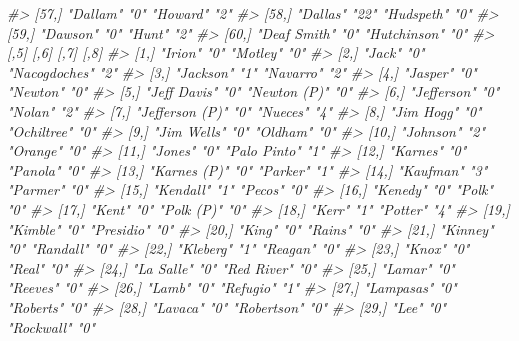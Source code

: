 \documentclass[
]{krantz}
\makeatletter
\newenvironment{Shaded}{\begin{snugshade}}{\end{snugshade}}
\newcommand{\CommentTok}[1]{\textcolor[rgb]{0.37,0.37,0.37}{\textit{#1}}}
\newenvironment{kframe}{%
\medskip{}
\setlength{\fboxsep}{.8em}
 \def\at@end@of@kframe{}%
 \ifinner\ifhmode%
  \def\at@end@of@kframe{\end{minipage}}%
  \begin{minipage}{\columnwidth}%
 \fi\fi%
 \def\FrameCommand##1{\hskip\@totalleftmargin \hskip-\fboxsep
 \colorbox{shadecolor}{##1}\hskip-\fboxsep
     \hskip-\linewidth \hskip-\@totalleftmargin \hskip\columnwidth}%
 \MakeFramed {\advance\hsize-\width
   \@totalleftmargin\z@ \linewidth\hsize
   \@setminipage}}%
 {\par\unskip\endMakeFramed%
 \at@end@of@kframe}
\renewenvironment{Shaded}{\begin{kframe}}{\end{kframe}}
\makeatother
\begin{document}
\begin{Shaded}
\begin{Highlighting}[]
\CommentTok{\#\textgreater{} [57,] "Dallam"        "0"  "Howard"      "2" }
\CommentTok{\#\textgreater{} [58,] "Dallas"        "22" "Hudspeth"    "0" }
\CommentTok{\#\textgreater{} [59,] "Dawson"        "0"  "Hunt"        "2" }
\CommentTok{\#\textgreater{} [60,] "Deaf Smith"    "0"  "Hutchinson"  "0" }
\CommentTok{\#\textgreater{}       [,5]            [,6] [,7]            [,8]}
\CommentTok{\#\textgreater{}  [1,] "Irion"         "0"  "Motley"        "0" }
\CommentTok{\#\textgreater{}  [2,] "Jack"          "0"  "Nacogdoches"   "2" }
\CommentTok{\#\textgreater{}  [3,] "Jackson"       "1"  "Navarro"       "2" }
\CommentTok{\#\textgreater{}  [4,] "Jasper"        "0"  "Newton"        "0" }
\CommentTok{\#\textgreater{}  [5,] "Jeff Davis"    "0"  "Newton (P)"    "0" }
\CommentTok{\#\textgreater{}  [6,] "Jefferson"     "0"  "Nolan"         "2" }
\CommentTok{\#\textgreater{}  [7,] "Jefferson (P)" "0"  "Nueces"        "4" }
\CommentTok{\#\textgreater{}  [8,] "Jim Hogg"      "0"  "Ochiltree"     "0" }
\CommentTok{\#\textgreater{}  [9,] "Jim Wells"     "0"  "Oldham"        "0" }
\CommentTok{\#\textgreater{} [10,] "Johnson"       "2"  "Orange"        "0" }
\CommentTok{\#\textgreater{} [11,] "Jones"         "0"  "Palo Pinto"    "1" }
\CommentTok{\#\textgreater{} [12,] "Karnes"        "0"  "Panola"        "0" }
\CommentTok{\#\textgreater{} [13,] "Karnes (P)"    "0"  "Parker"        "1" }
\CommentTok{\#\textgreater{} [14,] "Kaufman"       "3"  "Parmer"        "0" }
\CommentTok{\#\textgreater{} [15,] "Kendall"       "1"  "Pecos"         "0" }
\CommentTok{\#\textgreater{} [16,] "Kenedy"        "0"  "Polk"          "0" }
\CommentTok{\#\textgreater{} [17,] "Kent"          "0"  "Polk (P)"      "0" }
\CommentTok{\#\textgreater{} [18,] "Kerr"          "1"  "Potter"        "4" }
\CommentTok{\#\textgreater{} [19,] "Kimble"        "0"  "Presidio"      "0" }
\CommentTok{\#\textgreater{} [20,] "King"          "0"  "Rains"         "0" }
\CommentTok{\#\textgreater{} [21,] "Kinney"        "0"  "Randall"       "0" }
\CommentTok{\#\textgreater{} [22,] "Kleberg"       "1"  "Reagan"        "0" }
\CommentTok{\#\textgreater{} [23,] "Knox"          "0"  "Real"          "0" }
\CommentTok{\#\textgreater{} [24,] "La Salle"      "0"  "Red River"     "0" }
\CommentTok{\#\textgreater{} [25,] "Lamar"         "0"  "Reeves"        "0" }
\CommentTok{\#\textgreater{} [26,] "Lamb"          "0"  "Refugio"       "1" }
\CommentTok{\#\textgreater{} [27,] "Lampasas"      "0"  "Roberts"       "0" }
\CommentTok{\#\textgreater{} [28,] "Lavaca"        "0"  "Robertson"     "0" }
\CommentTok{\#\textgreater{} [29,] "Lee"           "0"  "Rockwall"      "0" }

\end{Highlighting}
\end{Shaded}
\end{document}
